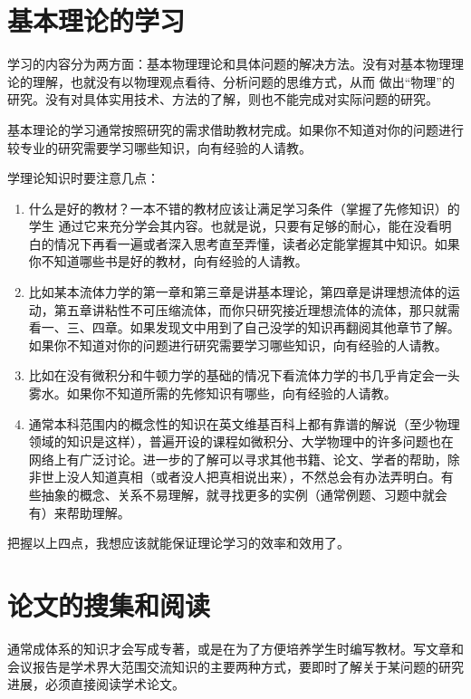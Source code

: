 \documentclass[a4paper,10pt,english]{sphinxmanual}
\begin{document}
\section{基本理论的学习}
\label{\detokenize{4. GetInfo:id2}}
学习的内容分为两方面：基本物理理论和具体问题的解决方法。没有对基本物理理论的理解，也就没有以物理观点看待、分析问题的思维方式，从而  做出“物理”的研究。没有对具体实用技术、方法的了解，则也不能完成对实际问题的研究。

基本理论的学习通常按照研究的需求借助教材完成。如果你不知道对你的问题进行较专业的研究需要学习哪些知识，向有经验的人请教。

学理论知识时要注意几点：
\begin{enumerate}
\item {} 
 什么是好的教材？一本不错的教材应该让满足学习条件（掌握了先修知识）的学生  通过它来充分学会其内容。也就是说，只要有足够的耐心，能在没看明白的情况下再看一遍或者深入思考直至弄懂，读者必定能掌握其中知识。如果你不知道哪些书是好的教材，向有经验的人请教。

\item {} 
 比如某本流体力学的第一章和第三章是讲基本理论，第四章是讲理想流体的运动，第五章讲粘性不可压缩流体，而你只研究接近理想流体的流体，那只就需看一、三、四章。如果发现文中用到了自己没学的知识再翻阅其他章节了解。如果你不知道对你的问题进行研究需要学习哪些知识，向有经验的人请教。

\item {} 
 比如在没有微积分和牛顿力学的基础的情况下看流体力学的书几乎肯定会一头雾水。如果你不知道所需的先修知识有哪些，向有经验的人请教。

\item {} 
 通常本科范围内的概念性的知识在英文维基百科上都有靠谱的解说（至少物理领域的知识是这样），普遍开设的课程如微积分、大学物理中的许多问题也在网络上有广泛讨论。进一步的了解可以寻求其他书籍、论文、学者的帮助，除非世上没人知道真相（或者没人把真相说出来），不然总会有办法弄明白。有些抽象的概念、关系不易理解，就寻找更多的实例（通常例题、习题中就会有）来帮助理解。

\end{enumerate}

把握以上四点，我想应该就能保证理论学习的效率和效用了。


\section{论文的搜集和阅读}
\label{\detokenize{4. GetInfo:id3}}
通常成体系的知识才会写成专著，或是在为了方便培养学生时编写教材。写文章和会议报告是学术界大范围交流知识的主要两种方式，要即时了解关于某问题的研究进展，必须直接阅读学术论文。
\end{document}
